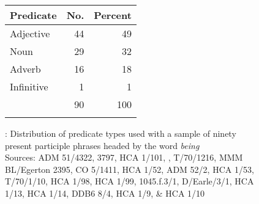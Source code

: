   
\begin{figure}
\begin{minipage}[c]{.375\textwidth}\begin{tabular}{lrr}
\lsptoprule
Predicate & No. & Percent\\
\midrule 
Adjective & 44 & 49\\
Noun & 29 & 32\\
Adverb & 16 & 18\\
Infinitive & 1 & 1\\
\midrule 
	& 90 & 100\\
\lspbottomrule	
\end{tabular}\end{minipage}%
\begin{minipage}[c]{.625\textwidth}%
\end{minipage}%
\caption{\label{fig:key:5.1}: Distribution of predicate types used with a sample of ninety present participle phrases headed by the word \textit{being}\\
{\tiny Sources: ADM 51/4322, 3797, HCA 1/101, \citealt{Brown2011}, T/70/1216, MMM BL/Egerton 2395, CO 5/1411, HCA 1/52, ADM 52/2, HCA 1/53, T/70/1/10, HCA 1/98, HCA 1/99, 1045.f.3/1, D/Earle/3/1, HCA 1/13, HCA 1/14, DDB6 8/4, HCA 1/9, \& HCA 1/10}
}
\end{figure}

 

